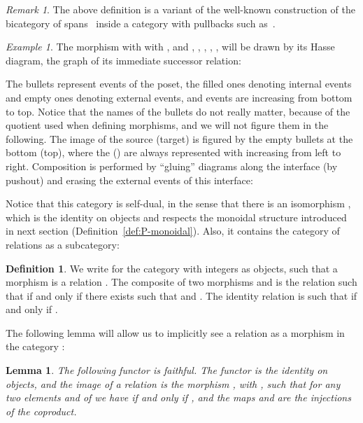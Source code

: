 \documentclass[submission,copyright,creativecommons]{eptcs}
\newtheorem{lemma}[theorem]{Lemma}
\theoremstyle{definition}
\newtheorem{definition}[theorem]{Definition}
\theoremstyle{remark}
\newtheorem{example}[theorem]{Example}
\newtheorem{remark}[theorem]{Remark}
\begin{document}
\begin{remark}
  The above definition is a variant of the well-known construction of the
  bicategory of spans~\cite{benabou1967introduction} inside a category with
  pullbacks such as~.
\end{remark}

\begin{example}
  \label{ex:P-composition}
  The morphism  with  with ,
   and , , , , ,  will be
  drawn by its Hasse diagram, \ie the graph of its immediate successor relation:
  
  The bullets represent events of the poset, the filled ones denoting internal
  events and empty ones denoting external events, and events are increasing from
  bottom to top. Notice that the names of the bullets do not really matter,
  because of the quotient used when defining morphisms, and we will not figure
  them in the following. The image of the source (\resp target) is figured by
  the empty bullets at the bottom (\resp top), where the  (\resp )
  are always represented with  increasing from left to right. Composition is
  performed by ``gluing'' diagrams along the interface (by pushout) and erasing
  the external events of this interface:
  
\end{example}

Notice that this category is self-dual, in the sense that there is an
isomorphism , which is the identity on objects and respects the
monoidal structure introduced in next section
(Definition~\ref{def:P-monoidal}). Also, it contains the category of relations
as a subcategory:

\begin{definition}
  \label{def:rel}
  We write  for the category with integers as objects, such that a
  morphism  is a relation . The
  composite of two morphisms  and  is the relation  such that  if and only if there exists
   such that  and . The identity
  relation  is such that  if and only if .
\end{definition}

\noindent
The following lemma will allow us to implicitly see a relation as a morphism in
the category :

\begin{lemma}
  \label{lemma:rel-poset}
  The following functor  is faithful. The functor is the identity on
  objects, and the image of a relation  is the morphism , with , such that for any two
  elements  and  of  we have  if and only if , and the maps  and
   are the injections of the coproduct.
\end{lemma}
\end{document}
